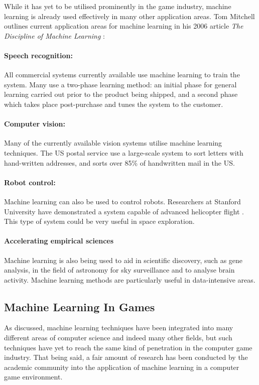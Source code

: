 \documentclass[a4paper,oneside]{report}
\begin{document}
While it has yet to be utilised prominently in the game industry, machine learning is already used effectively in many other application areas. Tom Mitchell outlines current application areas for machine learning in his 2006 article \emph{The Discipline of Machine Learning} \cite{Mitchell:2006fv}:

\paragraph{Speech recognition:} All commercial systems currently available use machine learning to train the system. Many use a two-phase learning method: an initial phase for general learning carried out prior to the product being shipped, and a second phase which takes place post-purchase and tunes the system to the customer.

\paragraph{Computer vision:} Many of the currently available vision systems utilise machine learning techniques. The US postal service use a large-scale system to sort letters with hand-written addresses, and sorts over 85\% of handwritten mail in the US.

\paragraph{Robot control:} Machine learning can also be used to control robots. Researchers at Stanford University have demonstrated a system capable of advanced helicopter flight \cite{Ng:2004dz, Abbeel07anapplication, Abbeel:fu}. This type of system could be very useful in space exploration.

\paragraph{Accelerating empirical sciences} Machine learning is also being used to aid in scientific discovery, such as gene analysis, in the field of astronomy for sky surveillance and to analyse brain activity. Machine learning methods are particularly useful in data-intensive areas.

\subsection{Machine Learning In Games}

As discussed, machine learning techniques have been integrated into many different areas of computer science and indeed many other fields, but such techniques have yet to reach the same kind of penetration in the computer game industry. That being said, a fair amount of research has been conducted by the academic community into the application of machine learning in a computer game environment. 
\end{document}
